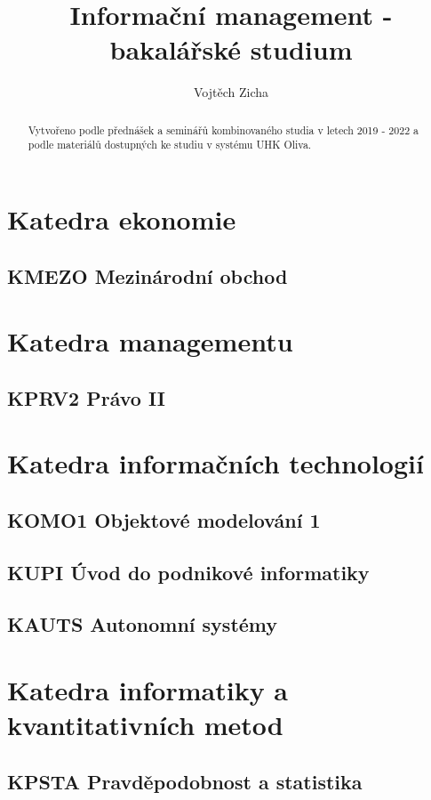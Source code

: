 \documentclass[twoside,12pt]{report}
\title{Informační management - bakalářské studium}
\author{Vojtěch Zicha}
\begin{document}
\maketitle%

\begin{abstract}
Vytvořeno podle přednášek a seminářů kombinovaného studia v letech 2019 - 2022 a podle materiálů dostupných ke studiu v systému UHK Oliva.
\end{abstract}

\tableofcontents
\clearpage

\part{Katedra ekonomie}
\chapter{KMEZO Mezinárodní obchod}


\part{Katedra managementu}
\chapter{KPRV2 Právo II}


\part{Katedra informačních technologií}
\chapter{KOMO1 Objektové modelování 1}


\chapter{KUPI Úvod do podnikové informatiky}


\chapter{KAUTS Autonomní systémy}


\part{Katedra informatiky a kvantitativních metod}
\chapter{KPSTA Pravděpodobnost a statistika}

\end{document}
